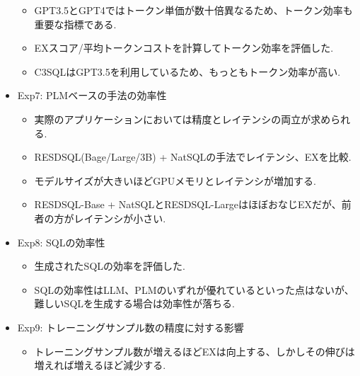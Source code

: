 \documentclass[dvipdfmx,uplatex]{jsarticle}
\theoremstyle{remark}
\newenvironment{experiment}[1]{
    \begin{tcolorbox}[
        colframe=violet,
        colback=violet!10!white,
        colbacktitle=violet!40!white,
        coltitle=black,
        fonttitle=\bfseries,
        title={#1}
    ]
}{
    \end{tcolorbox}
}
\begin{document}
\begin{experiment}{実験結果}
\begin{itemize}
\begin{itemize}
        \item GPT3.5とGPT4ではトークン単価が数十倍異なるため、トークン効率も重要な指標である.
        \item EXスコア/平均トークンコストを計算してトークン効率を評価した.
        \item C3SQLはGPT3.5を利用しているため、もっともトークン効率が高い.
    \end{itemize}
    \item Exp7: PLMベースの手法の効率性
    \begin{itemize}
        \item 実際のアプリケーションにおいては精度とレイテンシの両立が求められる.
        \item RESDSQL(Bage/Large/3B) + NatSQLの手法でレイテンシ、EXを比較.
        \item モデルサイズが大きいほどGPUメモリとレイテンシが増加する.
        \item RESDSQL-Base + NatSQLとRESDSQL-LargeはほぼおなじEXだが、前者の方がレイテンシが小さい.
    \end{itemize}
    \item Exp8: SQLの効率性
    \begin{itemize}
        \item 生成されたSQLの効率を評価した. 
        \item SQLの効率性はLLM、PLMのいずれが優れているといった点はないが、難しいSQLを生成する場合は効率性が落ちる.
    \end{itemize}
    \item Exp9: トレーニングサンプル数の精度に対する影響
    \begin{itemize}
        \item トレーニングサンプル数が増えるほどEXは向上する、しかしその伸びは増えれば増えるほど減少する.
    \end{itemize}
\end{itemize}
\end{experiment}
\end{document}
